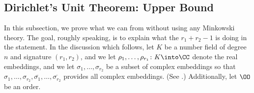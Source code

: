 \documentclass[../notes.tex]{subfiles}
\begin{document}
\subsection{Dirichlet's Unit Theorem: Upper Bound} \label{subsec:dirichlet-upper}
In this subsection, we prove what we can from  without using any Minkowski theory. The goal, roughly speaking, is to explain what the $r_1+r_2-1$ is doing in the statement. In the discussion which follows, let $K$ be a number field of degree $n$ and signature $(r_1,r_2)$, and we let $\rho_1,\ldots,\rho_{r_1}\colon K\into\CC$ denote the real embeddings, and we let $\sigma_1,\ldots,\sigma_{r_2}$ be a subset of complex embeddings so that $\sigma_1,\ldots,\sigma_{r_2},\overline{\sigma_1},\ldots,\overline{\sigma_{r_2}}$ provides all complex embeddings. (See .) Additionally, let $\OO$ be an order.
\end{document}
